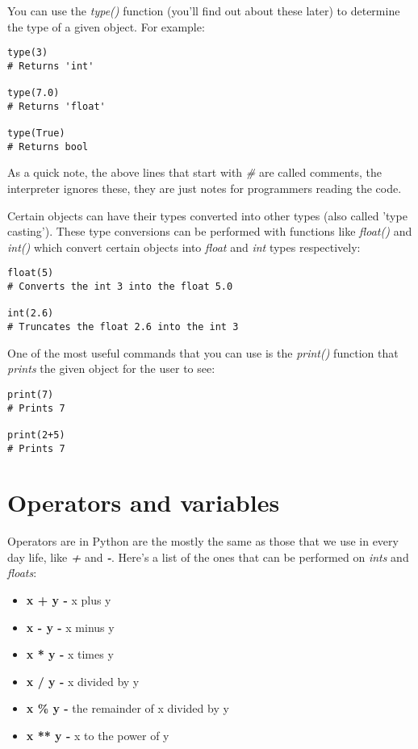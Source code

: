 \documentclass{article}
\begin{document}
You can use the \textit{type()} function (you'll find out about these later) to determine the type of a given object. For example:

\begin{verbatim}
type(3)
# Returns 'int'

type(7.0)
# Returns 'float'

type(True)
# Returns bool
\end{verbatim}

As a quick note, the above lines that start with \textit{\#} are called comments, the interpreter ignores these, they are just notes for programmers reading the code. \medskip

Certain objects can have their types converted into other types (also called 'type casting'). These type conversions can be performed with functions like \textit{float()} and \textit{int()} which convert certain objects into \textit{float} and \textit{int} types respectively:

\begin{verbatim}
float(5)
# Converts the int 3 into the float 5.0

int(2.6)
# Truncates the float 2.6 into the int 3
\end{verbatim}

One of the most useful commands that you can use is the \textit{print()} function that \textit{prints} the given object for the user to see:

\begin{verbatim}
print(7)
# Prints 7

print(2+5)
# Prints 7
\end{verbatim}

\section{Operators and variables}
Operators are in Python are the mostly the same as those that we use in every day life, like \textbf{\textit{+}} and \textbf{\textit{-}}. Here's a list of the ones that can be performed on \textit{ints} and \textit{floats}: \medskip

\begin{itemize}
\item \textbf{x + y -}  x plus y
\item \textbf{x - y -}  x minus y
\item \textbf{x * y -}  x times y
\item \textbf{x / y -}  x divided by y
\item \textbf{x \% y -}  the remainder of x divided by y
\item \textbf{x ** y -}  x to the power of y
\end{itemize}
\end{document}
